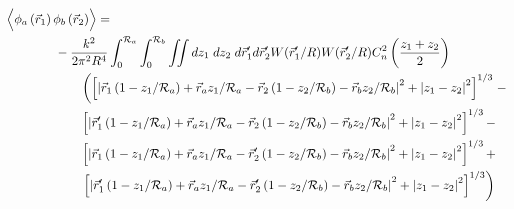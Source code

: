 \begin{equation}\label{prphase_n3}
\begin{aligned}
& \left\langle \vphantom{\hat{\phi}_{a}} \phi_{a}\left(\vec{r}_{1}\right) \phi_{b}\left(\vec{r}_{2}\right)\right\rangle = \\
&\quad\quad\quad\quad
-\frac{k^{2}}{2\pi^{2}R^{4}} \int_{0}^{\mathcal{R}_{a}}  \int_{0}^{\mathcal{R}_{b}} \iint dz_{1} \; dz_{2} \; d\vec{r}^{\prime}_{1}d\vec{r}^{\prime}_{2}  
W(\vec{r}^{\prime}_{1}/R) W(\vec{r}^{\prime}_{2}/R) C_{n}^{2}\left(\frac{z_{1} + z_{2}}{2}\right) \\
&\quad\quad\quad\quad\quad\quad
\left(
\left[ \left\vert \vec{r}_{1}\left(1-z_{1}/\mathcal{R}_{a}\right) + \vec{r}_{a} z_{1}/\mathcal{R}_{a} - 
\vec{r}_{2}\left(1-z_{2}/\mathcal{R}_{b}\right) - \vec{r}_{b} z_{2}/\mathcal{R}_{b}\right\vert^{2} + 
\left\vert z_{1} - z_{2} \right\vert^{2}\right]^{1/3}
\right. -\\
& \quad\quad\quad\quad\quad\quad
\left[ \left\vert \vec{r}^{\prime}_{1}\left(1-z_{1}/\mathcal{R}_{a}\right) + \vec{r}_{a} z_{1}/\mathcal{R}_{a} - 
\vec{r}_{2}\left(1-z_{2}/\mathcal{R}_{b}\right) - \vec{r}_{b} z_{2}/\mathcal{R}_{b}\right\vert^{2} + 
\left\vert z_{1} - z_{2} \right\vert^{2}\right]^{1/3} - \\
& \quad\quad\quad\quad\quad\quad
\left[ \left\vert \vec{r}_{1}\left(1-z_{1}/\mathcal{R}_{a}\right) + \vec{r}_{a} z_{1}/\mathcal{R}_{a} - 
\vec{r}^{\prime}_{2}\left(1-z_{2}/\mathcal{R}_{b}\right) - \vec{r}_{b} z_{2}/\mathcal{R}_{b}\right\vert^{2} + 
\left\vert z_{1} - z_{2} \right\vert^{2}\right]^{1/3} + \\
& \quad\quad\quad\quad\quad\quad
\left.
\left[ \left\vert \vec{r}^{\prime}_{1}\left(1-z_{1}/\mathcal{R}_{a}\right) + \vec{r}_{a} z_{1}/\mathcal{R}_{a} - 
\vec{r}^{\prime}_{2}\left(1-z_{2}/\mathcal{R}_{b}\right) - \vec{r}_{b} z_{2}/\mathcal{R}_{b}\right\vert^{2} + 
\left\vert z_{1} - z_{2} \right\vert^{2}\right]^{1/3}\right)
\end{aligned}
\end{equation}

